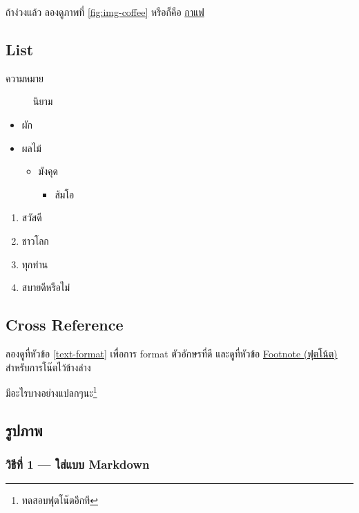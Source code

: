 \documentclass[
]{article}
\providecommand{\tightlist}{%
  \setlength{\itemsep}{0pt}\setlength{\parskip}{0pt}}
\begin{document}
ถ้าง่วงแล้ว ลองดูภาพที่ \ref{fig:img-coffee} หรือก็คือ \protect\hyperlink{coffee}{กาแฟ}

\hypertarget{list}{%
\subsection{List}\label{list}}

\begin{description}
\item[ความหมาย]
นิยาม
\end{description}

\begin{itemize}
\item
  ผัก
\item
  ผลไม้

  \begin{itemize}
  \item
    มังคุด

    \begin{itemize}
    \tightlist
    \item
      ส้มโอ
    \end{itemize}
  \end{itemize}
\end{itemize}

\begin{enumerate}
\def\labelenumi{\arabic{enumi}.}
\tightlist
\item
  สวัสดี
\item
  ชาวโลก
\item
  ทุกท่าน
\item
  สบายดีหรือไม่
\end{enumerate}

\hypertarget{cross-reference}{%
\subsection{Cross Reference}\label{cross-reference}}

ลองดูที่หัวข้อ \ref{text-format} เพื่อการ format ตัวอักษรที่ดี และดูที่หัวข้อ \protect\hyperlink{footnote}{Footnote (ฟุตโน้ต)} สำหรับการโน๊ตไว้ข้างล่าง

มีอะไรบางอย่างแปลกๆนะ\footnote{ทดสอบฟุตโน๊ตอีกที}

\hypertarget{image}{%
\subsection{รูปภาพ}\label{image}}

\hypertarget{image-method1}{%
\subsubsection{วิธีที่ 1 --- ใส่แบบ Markdown}\label{image-method1}}
\end{document}
